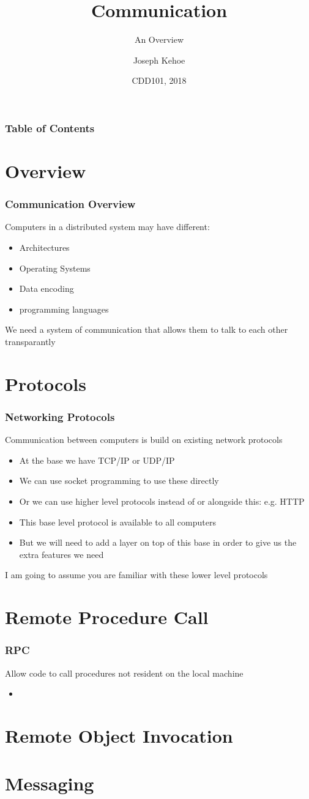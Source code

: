\documentclass{beamer}
\title[Distributed Systems] %
{Communication}
\subtitle{An Overview}
\author[Dr. Joseph Kehoe] %
{Joseph Kehoe\inst{1}}
\institute[IT Carlow] %
{
	\inst{1}%
	Department of Computing and Networking\\
	Institute of Technology Carlow
}
\date[ITC 2018] %
{CDD101, 2018}
\begin{document}
 
\frame{\titlepage}
 
  \begin{frame}
  	\frametitle{Table of Contents}
  	\tableofcontents
  \end{frame}
 

\section{Overview}
  \begin{frame}
  	\frametitle{Communication Overview}
  	Computers in a distributed system may have different:
  	\begin{itemize}
  		\item Architectures
  		\item Operating Systems
  		\item Data encoding
  		\item programming languages
  	\end{itemize}
We need a system of communication that allows them to talk to each other transparantly
  	
  \end{frame}
  
\section{Protocols}

  \begin{frame}
  	\frametitle{Networking Protocols}
  	Communication between computers is build on existing network protocols
  	\begin{itemize}
  		\item At the base we have TCP/IP or UDP/IP
  		\item We can use socket programming to use these directly
  		\item Or we can use higher level protocols instead of or alongside this: e.g. HTTP
  		\item This base level protocol is available to all computers
  		\item But we will need to add a layer on top of this base in order to give us the extra features we need
  	\end{itemize}
I am going to assume you are familiar with these lower level protocols
  	
  \end{frame}

\section{Remote Procedure Call}
  \begin{frame}
  	\frametitle{RPC}
  	Allow code to call procedures not resident on the local machine
  	\begin{itemize}
  		\item 
  	\end{itemize}
  	
  	
  \end{frame}
  
\section{Remote Object Invocation}
\section{Messaging}
\end{document}
